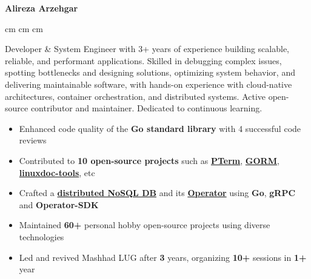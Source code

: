 \documentclass{engineercv}
\begin{document}
\begin{center}
  \textbf{\fontsize{24 pt}{24 pt}\selectfont Alireza Arzehgar}

  \vspace{0.2 cm}

  \scriptsize
  \mbox{}
   cm
  \mbox{}
   cm
  \mbox{}
   cm
  \mbox{}
\end{center}


Developer & System Engineer with 3+ years of experience building scalable, reliable, and performant applications.
Skilled in debugging complex issues,
spotting bottlenecks and designing solutions,
optimizing system behavior, and delivering maintainable software,
with hands-on experience with cloud-native architectures, container orchestration, and distributed systems.
Active open-source contributor and maintainer.
Dedicated to continuous learning.

\begin{itemize}
  \item Enhanced code quality of the \textbf{Go standard library} with 4 successful code reviews
  \item Contributed to \textbf{10 open-source projects} such as
  \textbf{\href{https://github.com/pterm/pterm/commits/master/?author=alirezaarzehgar}{\color{darkgray} PTerm}},
  \textbf{\href{https://github.com/go-gorm/postgres/commits/master/?author=alirezaarzehgar}{\color{darkgray} GORM}},
  \textbf{\href{https://gitlab.com/agmartin/linuxdoc-tools/-/commits/master?search=alirezaarzehgar}{\color{darkgray} linuxdoc-tools}},
  etc
  \item Crafted a \textbf{\href{https://github.com/alirezaarzehgar/writy}{\color{darkgray} distributed NoSQL DB}}
  and its \textbf{\href{https://github.com/alirezaarzehgar/writy-operator}{\color{darkgray} Operator}}
  using \textbf{Go}, \textbf{gRPC} and \textbf{Operator-SDK}
  \item Maintained \textbf{60+} personal hobby open-source projects using diverse technologies
  \item Led and revived Mashhad LUG after \textbf{3} years, organizing \textbf{10+} sessions in \textbf{1+} year
\end{itemize}
\end{document}
